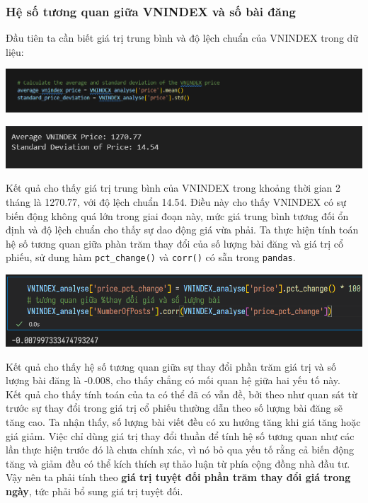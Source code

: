 \subsubsection{Hệ số tương quan giữa VNINDEX và số bài đăng}
Đầu tiên ta cần biết giá trị trung bình và độ lệch chuẩn của VNINDEX trong dữ liệu:

\begin{center}
    \centering
    \includegraphics[width=0.85\linewidth]{images/C2_pic31.png}
\end{center}
\begin{center}
    \includegraphics[width=0.75\linewidth]{images/C2_pic32.png}
\end{center}

Kết quả cho thấy giá trị trung bình của VNINDEX trong khoảng thời gian 2 tháng là 1270.77, với độ lệch chuẩn 14.54. Điều này cho thấy VNINDEX có sự biến động không quá lớn trong giai đoạn này, mức giá trung bình tương đối ổn định và độ lệch chuẩn cho thấy sự dao động giá vừa phải. Ta thực hiện tính toán hệ số tương quan giữa phàn trăm thay đổi của số lượng bài đăng và giá trị cổ phiếu, sử dung hàm \texttt{pct\_change()} và \texttt{corr()} có sẵn trong \texttt{pandas}.

\begin{center}
    \centering
    \includegraphics[width=0.75\linewidth]{images/C4_1.png}
\end{center}

Kết quả cho thấy hệ số tương quan giữa sự thay đổi phần trăm giá trị và số lượng bài đăng là -0.008, cho thấy chẳng có mối quan hệ giữa hai yếu tố này.\\

Kết quả cho thấy tính toán của ta có thể đã có vẫn đề, bởi theo như quan sát từ trước sự thay đổi trong giá trị cổ phiếu thường dẫn theo số lượng bài đăng sẽ tăng cao. Ta nhận thấy, số lượng bài viết đều có xu hướng tăng khi giá tăng hoặc giá giảm. Việc chỉ dùng giá trị thay đổi thuần để tính hệ số tương quan như các lần thực hiện trước đó là chưa chính xác, vì nó bỏ qua yếu tố rằng cả biến động tăng và giảm đều có thể kích thích sự thảo luận từ phía cộng đồng nhà đầu tư. Vậy nên ta phải tính theo \textbf{giá trị tuyệt đối phần trăm thay đổi giá trong ngày}, tức phải bổ sung giá trị tuyệt đối.

